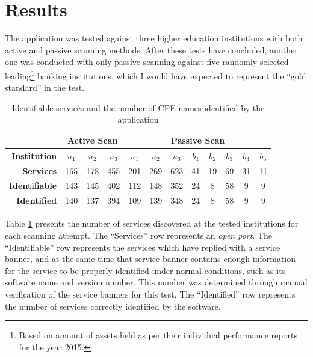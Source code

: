 \documentclass[a4paper,12pt]{article}
\begin{document}
\section{Results}
 

	The application was tested against three higher education institutions with both active and passive scanning methods. After these tests have concluded, another one was conducted with only passive scanning against five randomly selected leading\footnote{Based on amount of assets held as per their individual performance reports for the year 2015.} banking institutions, which I would have expected to represent the ``gold standard'' in the test.

	\begin{table}[H]
		\centering
		\begin{tabular}{r|ccc|ccc|ccccc|}
			\cline{2-12}
			\multicolumn{1}{l|}{}                         & \multicolumn{3}{c|}{\textbf{Active Scan}} & \multicolumn{8}{c|}{\textbf{Passive Scan}}                                                             \\ \hline
			\multicolumn{1}{|r|}{\textbf{Institution}}      & \textbf{$u_1$}    & \textbf{$u_2$}    & \textbf{$u_3$}   & \textbf{$u_1$} & \textbf{$u_2$} & \textbf{$u_3$} & \textbf{$b_1$} & \textbf{$b_2$} & \textbf{$b_3$} & \textbf{$b_4$} & \textbf{$b_5$} \\ \hline
			\multicolumn{1}{|r|}{\textbf{Services}} & 165            & 178            & 455           & 201         & 269         & 623         & 41          & 19          & 69          & 31          & 11          \\
			\multicolumn{1}{|r|}{\textbf{Identifiable}} & 143            & 145            & 402           & 112         & 148         & 352         & 24          & 8           & 58          & 9           & 9           \\
			\multicolumn{1}{|r|}{\textbf{Identified}}   & 140            & 137            & 394           & 109         & 139         & 348         & 24          & 8           & 58          & 9           & 9           \\ \hline
		\end{tabular}
		\caption{Identifiable services and the number of CPE names identified by the application}
		\label{cpeids}
	\end{table}
	
	Table \ref{cpeids} presents the number of services discovered at the tested institutions for each scanning attempt. The ``Services'' row represents an \textit{open port}. The ``Identifiable'' row represents the services which have replied with a service banner, and at the same time that service banner contains enough information for the service to be properly identified under normal conditions, such as its software name and version number. This number was determined through manual verification of the service banners for this test. The ``Identified'' row represents the number of services correctly identified by the software.
	
\end{document}
